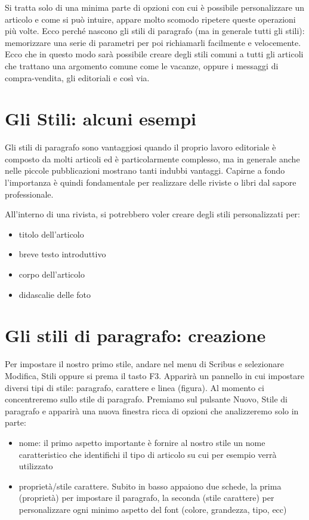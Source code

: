 \documentclass[a4paper, 12pt]{book}
\begin{document}
Si tratta solo di una minima parte di opzioni con cui è possibile personalizzare un articolo e come si può intuire, appare molto scomodo ripetere queste operazioni più volte. Ecco perché nascono gli stili di paragrafo (ma in generale tutti gli stili): memorizzare una serie di parametri per poi richiamarli facilmente e velocemente. Ecco che in questo modo sarà possibile creare degli stili comuni a tutti gli articoli che trattano una argomento comune come le vacanze, oppure i messaggi di compra-vendita, gli editoriali e così via.

\section{Gli Stili: alcuni esempi}
Gli stili di paragrafo sono vantaggiosi quando il proprio lavoro editoriale è composto da molti articoli ed è particolarmente complesso, ma in generale anche nelle piccole pubblicazioni mostrano tanti indubbi vantaggi. Capirne a fondo l'importanza è quindi fondamentale per realizzare delle riviste o libri dal sapore professionale. 

All'interno di una rivista, si potrebbero voler creare degli stili  personalizzati per:

\begin{itemize}
	\item titolo dell'articolo

	\item breve testo introduttivo

	\item corpo dell'articolo

	\item didascalie delle foto
\end{itemize}

\section{Gli stili di paragrafo: creazione}
Per impostare il nostro primo stile, andare nel menu di Scribus e selezionare Modifica, Stili oppure si prema il tasto F3. Apparirà un pannello in cui impostare diversi tipi di stile: paragrafo, carattere e linea (figura). Al momento ci concentreremo sullo stile di paragrafo. Premiamo sul pulsante Nuovo, Stile di paragrafo e apparirà una nuova finestra ricca di opzioni che analizzeremo solo in parte:

\begin{itemize}
	\item nome: il primo aspetto importante è fornire al nostro stile un nome caratteristico che identifichi il tipo di articolo su cui per esempio verrà utilizzato

	\item proprietà/stile carattere. Subito in basso appaiono due schede, la prima (proprietà) per impostare il paragrafo, la seconda (stile carattere) per personalizzare ogni minimo aspetto del font (colore, grandezza, tipo, ecc)
\end{itemize}
\end{document}
